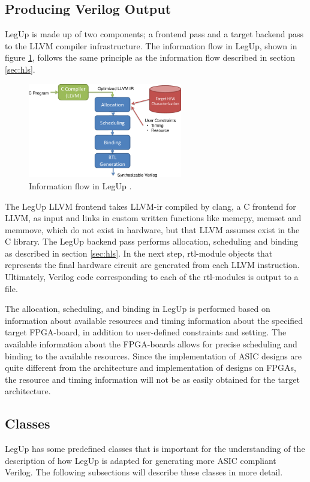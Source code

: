 \subsection{Producing Verilog Output}
LegUp is made up of two components; a frontend pass and a target backend pass to the LLVM compiler infrastructure. 
The information flow in LegUp, shown in figure \ref{fig:legupflow}, follows the same principle as the information flow described in section \ref{sec:hls}.
\begin{figure}[hbpt]
\centering
\includegraphics[width=0.6\textwidth]{../figs/LegUpFlow.png}
\caption{\label{fig:legupflow}Information flow in LegUp \cite{legupmaual}.}
\end{figure}
The LegUp LLVM frontend takes LLVM-\gls{ir} compiled by clang, a C frontend for LLVM, as input and links in custom written functions like memcpy, memset and memmove, which do not exist in hardware, but that LLVM assumes exist in the C library. 
The LegUp backend pass performs allocation, scheduling and binding as described in section \ref{sec:hls}. In the next step, \gls{rtl}-module objects that represents the final hardware circuit are generated from each LLVM instruction. Ultimately, Verilog code corresponding to each of the \gls{rtl}-modules is output to a file.

The allocation, scheduling, and binding in LegUp is performed based on information about available resources and timing information about the specified target FPGA-board, in addition to user-defined constraints and setting. The available information about the FPGA-boards allows for precise scheduling and binding to the available resources. Since the implementation of ASIC designs are quite different from the architecture and implementation of designs on FPGAs, the resource and timing information will not be as easily obtained for the target architecture. 

\subsection{\label{sec:legupclasses}Classes}
LegUp has some predefined classes that is important for the understanding of the description of how LegUp is adapted for generating more ASIC compliant Verilog. The following subsections will describe these classes in more detail.
